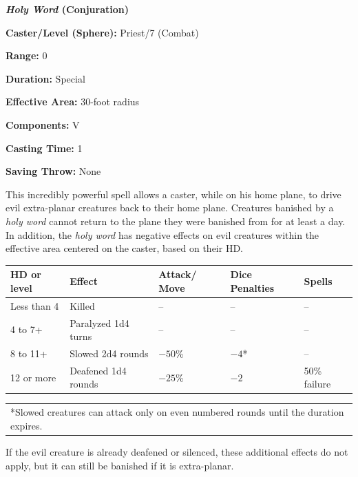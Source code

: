 \begin{multicols}{2}
\vspace{1em}

\noindent
\begin{minipage}{\columnwidth}

\noindent \textbf{\textit{Holy Word} (Conjuration)}

\noindent \textbf{Caster/Level (Sphere):} Priest/7 (Combat)

\noindent \textbf{Range:} 0

\noindent \textbf{Duration:} Special

\noindent \textbf{Effective Area:} 30-foot radius

\noindent \textbf{Components:} V

\noindent \textbf{Casting Time:} 1

\noindent \textbf{Saving Throw:} None

\end{minipage}

This incredibly powerful spell allows a caster, while on his home plane, to drive evil extra-planar creatures back to their home plane.  Creatures banished by a \textit{holy word} cannot return to the plane they were banished from for at least a day.  In addition, the \textit{holy word} has negative effects on evil creatures within the effective area centered on the caster, based on their HD.

\noindent
\begin{tabular}{|p{}|p{}|p{}|p{}|p{}|}
\hline
HD or level	& Effect	& Attack/ Move	& Dice Penalties	& Spells \\
\hline\hline
\rowcolor[gray]{.9}Less than 4	& Killed	& --	& --	& -- \\
4 to 7+	& Paralyzed 1d4 turns	& --	& --	& -- \\
\rowcolor[gray]{.9}8 to 11+	& Slowed 2d4 rounds	& $-50$\%	& $-4$*	& -- \\
12 or more	& Deafened 1d4 rounds	& $-25$\%	& $-2$	& 50\% failure \\
\hline
\end{tabular}
\noindent\begin{tabular}{p{}}
*Slowed creatures can attack only on even numbered rounds until the duration expires. \\
\end{tabular}\vspace{.5em}

If the evil creature is already deafened or silenced, these additional effects do not apply, but it can still be banished if it is extra-planar.


\end{multicols}
